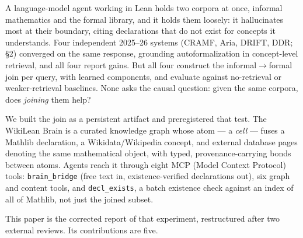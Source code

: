 \documentclass[10pt]{article}
\newcommand{\code}[1]{\texttt{#1}}
\begin{document}
A language-model agent working in Lean holds two corpora at once,
informal mathematics and the formal library, and it holds them loosely:
it hallucinates most at their boundary, citing declarations that do not
exist for concepts it understands. Four independent 2025--26 systems
(CRAMF, Aria, DRIFT, DDR; \S 2) converged on the same response, grounding
autoformalization in concept-level retrieval, and all four report gains.
But all four construct the informal$\to$formal join per query, with
learned components, and evaluate against no-retrieval or
weaker-retrieval baselines. None asks the causal question: given the
same corpora, does \emph{joining} them help?

We built the join as a persistent artifact and preregistered that test.
The WikiLean Brain is a curated knowledge graph whose atom --- a
\emph{cell} --- fuses a Mathlib declaration, a Wikidata/Wikipedia
concept, and external database pages denoting the same mathematical
object, with typed, provenance-carrying bonds between atoms. Agents
reach it through eight MCP (Model Context Protocol) tools:
\code{brain\_bridge} (free text in, existence-verified declarations
out), six graph and content tools, and \code{decl\_exists}, a batch
existence check against an index of all of Mathlib, not just the joined
subset.

This paper is the corrected report of that experiment, restructured
after two external reviews. Its contributions are five.
\end{document}

